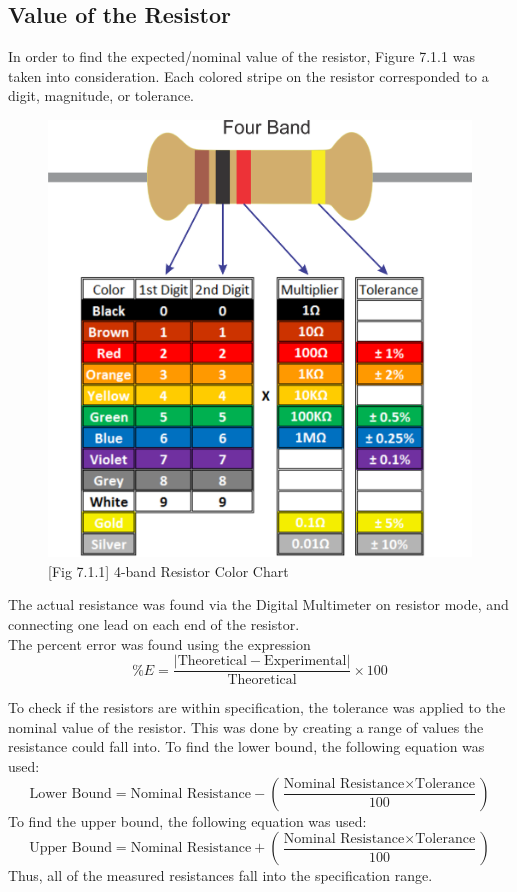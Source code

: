 \documentclass[titlepage]{article}
\begin{document}
        \subsection{Value of the Resistor} 
		In order to find the expected/nominal value of the resistor, Figure 7.1.1 was taken into consideration. Each colored stripe on the resistor corresponded to a digit, magnitude, or tolerance. 
		\begin{center}
		\begin{figure}[h!]
			\caption*{[Fig 7.1.1] 4-band Resistor Color Chart}
			\centering
                \includegraphics[scale=0.17]{results/band-code.jpg}
	\end{figure}
	\end{center}
The actual resistance was found via the Digital Multimeter on resistor mode, and connecting one lead on each end of the resistor. \\
\vspace{0.5cm}
The percent error was found using the expression
\[\%E = \frac{|\text{Theoretical} - \text{Experimental}|}{\text{Theoretical}} \times 100\]

To check if the resistors are within specification, the tolerance was applied to the nominal value of the resistor. This was done by creating a range of values the resistance could fall into. To find the lower bound, the following equation was used:
\[\text{Lower Bound} = \text{Nominal Resistance} - \left(\frac{\text{Nominal Resistance} \times \text{Tolerance}}{100}\right)\] 
To find the upper bound, the following equation was used:
\[\text{Upper Bound} = \text{Nominal Resistance} + \left(\frac{\text{Nominal Resistance} \times \text{Tolerance}}{100}\right)\] 
Thus, all of the measured resistances fall into the specification range.
\end{document}
